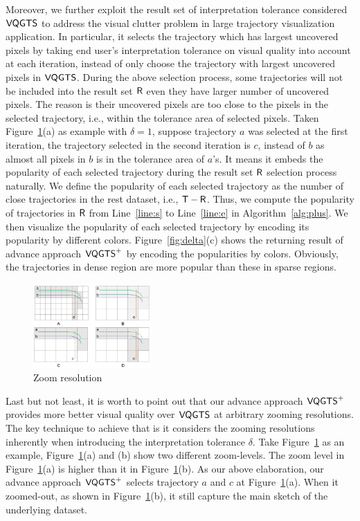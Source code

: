 Moreover, we further exploit the result set of interpretation tolerance considered $\mathsf{VQGTS}$ to address the visual clutter problem in large trajectory visualization application.
In particular, it selects the trajectory which has largest uncovered pixels by taking end user's interpretation tolerance on visual quality into account at each iteration,
instead of only choose the trajectory with largest uncovered pixels in $\mathsf{VQGTS}$.
During the above selection process, some trajectories will not be included into the result set $\mathsf{R}$ even they have larger number of uncovered pixels.
The reason is their uncovered pixels are too close to the pixels in the selected trajectory, i.e., within the tolerance area of selected pixels.
Taken Figure~\ref{fig:zoom}(a) as example with $\delta=1$, suppose trajectory $a$ was selected at the first iteration,
the trajectory selected in the second iteration is $c$, instead of $b$ as almost all pixels in $b$ is in the tolerance area of $a$'s.
It means it embeds the popularity of each selected trajectory during the result set $\mathsf{R}$ selection process naturally.
We define the popularity of each selected trajectory as the number of close trajectories in the rest dataset, i.e., $\mathsf{T}-\mathsf{R}$.
Thus, we compute the popularity of trajectories in $\mathsf{R}$ from Line~\ref{line:s} to Line~\ref{line:e} in Algorithm~\ref{alg:plus}.
We then visualize the popularity of each selected trajectory by encoding its popularity by different colors.
Figure~\ref{fig:delta}(c) shows the returning result of advance approach $\mathsf{VQGTS}^{+}$ by encoding the popularities by colors.
Obviously, the trajectories in dense region are more popular than these in sparse regions.

\begin{figure}[t]
	\centering
	\includegraphics[width=0.4\textwidth]{pictures/problemsolveing/one_to_many.pdf}
	\caption{Zoom resolution}
	\label{fig:zoom}
\end{figure}

Last but not least, it is worth to point out that our advance approach $\mathsf{VQGTS}^{+}$ provides more better visual quality over $\mathsf{VQGTS}$ at arbitrary zooming resolutions.
The key technique to achieve that is it considers the zooming resolutions inherently when introducing the interpretation tolerance $\delta$.
Take Figure~\ref{fig:zoom} as an example, Figure~\ref{fig:zoom}(a) and (b) show two different zoom-levels.
The zoom level in Figure~\ref{fig:zoom}(a) is higher than it in Figure~\ref{fig:zoom}(b).
As our above elaboration, our advance approach $\mathsf{VQGTS}^{+}$ selects trajectory $a$ and $c$ at Figure~\ref{fig:zoom}(a).
When it zoomed-out, as shown in Figure~\ref{fig:zoom}(b), it still capture the main sketch of the underlying dataset.




